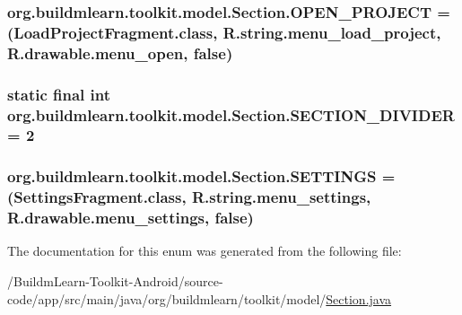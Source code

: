 \hypertarget{enumorg_1_1buildmlearn_1_1toolkit_1_1model_1_1Section_af342562594f60ed736f519aaa1932127}{
\subsubsection[{O\-P\-E\-N\-\_\-\-P\-R\-O\-J\-E\-C\-T}]{\setlength{\rightskip}{0pt plus 5cm}org.\-buildmlearn.\-toolkit.\-model.\-Section.\-O\-P\-E\-N\-\_\-\-P\-R\-O\-J\-E\-C\-T =(Load\-Project\-Fragment.\-class, R.\-string.\-menu\-\_\-load\-\_\-project, R.\-drawable.\-menu\-\_\-open, false)}}\label{enumorg_1_1buildmlearn_1_1toolkit_1_1model_1_1Section_af342562594f60ed736f519aaa1932127}
\hypertarget{enumorg_1_1buildmlearn_1_1toolkit_1_1model_1_1Section_acc0a57a45c96711214e40f17b5b3cfe0}{
\subsubsection[{S\-E\-C\-T\-I\-O\-N\-\_\-\-D\-I\-V\-I\-D\-E\-R}]{\setlength{\rightskip}{0pt plus 5cm} static  final int org.\-buildmlearn.\-toolkit.\-model.\-Section.\-S\-E\-C\-T\-I\-O\-N\-\_\-\-D\-I\-V\-I\-D\-E\-R = 2\hspace{0.3cm}{\ttfamily [static]}}}\label{enumorg_1_1buildmlearn_1_1toolkit_1_1model_1_1Section_acc0a57a45c96711214e40f17b5b3cfe0}
\hypertarget{enumorg_1_1buildmlearn_1_1toolkit_1_1model_1_1Section_a6829d7052c40f9c876e0886cc093be85}{
\subsubsection[{S\-E\-T\-T\-I\-N\-G\-S}]{\setlength{\rightskip}{0pt plus 5cm}org.\-buildmlearn.\-toolkit.\-model.\-Section.\-S\-E\-T\-T\-I\-N\-G\-S =(Settings\-Fragment.\-class, R.\-string.\-menu\-\_\-settings, R.\-drawable.\-menu\-\_\-settings, false)}}\label{enumorg_1_1buildmlearn_1_1toolkit_1_1model_1_1Section_a6829d7052c40f9c876e0886cc093be85}


The documentation for this enum was generated from the following file\-:\begin{DoxyCompactItemize}
\item 
/\-Buildm\-Learn-\/\-Toolkit-\/\-Android/source-\/code/app/src/main/java/org/buildmlearn/toolkit/model/\hyperlink{Section_8java}{Section.\-java}\end{DoxyCompactItemize}
